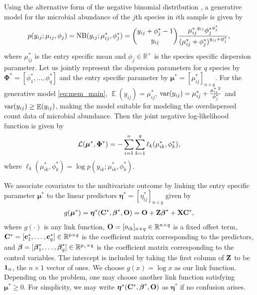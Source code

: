 \documentclass[12pt]{article}
\newcommand{\bbL}{\mathcal{L}}
\newcommand{\bs}{\boldsymbol}
\DeclareMathOperator{\EX}{\mathbb{E}}%
\begin{document}
Using the alternative  form  of the negative binomial distribution \citep{zeileis2008regression}, a generative model for the microbial abundance of  the $j$th species in $i$th sample is given by 
\begin{align}
p(y_{ij}; \mu_{ij}, \phi_j)  = \mbox{NB}(y_{ij};  \mu_{ij}^*, \phi_j^*) = {y_{ij} + \phi_j^* -1 \choose y_{ij}}  \frac{{\mu_{ij}^*}^{y_{ij}} {\phi_j^*}^{\phi_j^*} }{(\mu_{ij}^* + \phi_j^*)^{y_{ij} + \phi_j^*} },\label{eq:mem_main}
\end{align}
where  $\mu_{ij}^*$ is the entry specific mean  and $\phi_j \in \mathbb{R}^+$ is the species specific dispersion parameter. Let us jointly represent   the  dispersion  parameters for  $q$ species by  $\bs\Phi^* = [\phi_1^*, \ldots, \phi_q^*]$ and the entry specific parameter by $\bs\mu^* = [\mu_{ij}^*]_{n \times q}$.  For the generative model \eqref{eq:mem_main},   $\EX(y_{ij}) =  \mu_{ij}^*$, $\mathrm{var}(y_{ij}) = \mu_{ij}^* + \frac{{\mu_{ij}^*}^2 }{\phi_j^*}$ and $\var(y_{ij}) \geq \EX(y_{ij})$,  making the model suitable for modeling the overdispersed count data of microbial abundance.  %
Then the joint negative log-likelihood function is given by 
\begin{align}
\bbL(\bs\mu^*, \bPhi^*) =  -\sum_{i=1}^n\sum_{k=1}^q \ell_k(\mu_{ik}^*,\phi_k^*)  ,\label{eq:negLogLi}
\end{align}
where $\ell_k(\mu_{ik}^*,\phi_k^*) = \log{p(y_{ik};\mu_{ik}^*,\phi_k^*)}$. 

We associate covariates to the multivariate outcome by linking the entry specific parameter $\bs\mu^*$ to the linear predictors $\bs\eta^* = [\eta_{ij}^*]_{n \times q}$ given  by 
\begin{align}
g(\bs\mu^*) = \bs\eta^*(\C^*,\bbeta^*, \bO) = \bO + \Z\bbeta^* + \X\C^*, \label{eq:ThetaDef}
\end{align}
where $g(\cdot)$ is any link function, $ {\bf O}  = [o_{ik}]_{n \times q} \in \mathbb{R}^{n \times q}$ is a fixed offset term, ${\bf C}^*=[{\bf c}_1^*,\ldots,{\bf c}_q^*] \in \mathbb{R}^{p\times q}$ is the coefficient matrix corresponding to the predictors, and $\mbox{\boldmath $\beta$}=[\mbox{\boldmath $\beta$}_1^*,\ldots,\mbox{\boldmath $\beta$}_q^*]  \in \mathbb{R}^{p_z\times q}$ is the coefficient matrix corresponding to the control variables. 
The intercept is included by taking the first column of ${\bf Z}$ to be ${\bf 1}_n$, the $n\times 1$ vector of ones. We choose $g(x) = \log{x}$ as our link function. Depending on the problem, one may choose another link function satisfying $\bs\mu^* \geq 0$.  For simplicity, we may write $\bs\eta^*(\C^*,\bbeta^*, \bO)$ as $\bs\eta^*$ if no confusion arises. 
\end{document}
